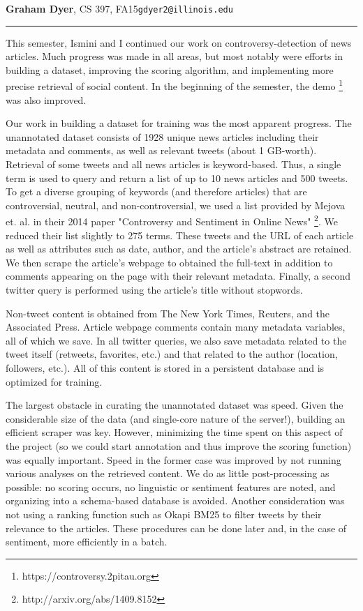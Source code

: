 \documentclass{article}[12pt]
\begin{document}
\noindent\textbf{Graham Dyer}, CS 397, FA15\hfill{\tt{gdyer2}\tt{@}\tt{illinois}\tt{.}\tt{edu}}
\hrule
\vspace{5mm}
This semester, Ismini and I continued our work on controversy-detection of news articles. Much progress was made in all areas, but most notably were efforts in building a dataset, improving the scoring algorithm, and implementing more precise retrieval of social content. In the beginning of the semester, the demo \footnote{https://controversy.2pitau.org} was also improved.

Our work in building a dataset for training was the most apparent progress. The unannotated dataset consists of 1928 unique news articles including their metadata and comments, as well as relevant tweets (about 1 GB-worth). Retrieval of some tweets and all news articles is keyword-based. Thus, a single term is used to query and return a list of up to 10 news articles and 500 tweets. To get a diverse grouping of keywords (and therefore articles) that are controversial, neutral, and non-controversial, we used a list provided by Mejova et. al. in their 2014 paper "Controversy and Sentiment in Online News" \footnote{http://arxiv.org/abs/1409.8152}. We reduced their list slightly to 275 terms. These tweets and the URL of each article as well as attributes such as date, author, and the article's abstract are retained. We then scrape the article's webpage to obtained the full-text in addition to comments appearing on the page with their relevant metadata. Finally, a second twitter query is performed using the article's title without stopwords.

Non-tweet content is obtained from The New York Times, Reuters, and the Associated Press. Article webpage comments contain many metadata variables, all of which we save. In all twitter queries, we also save metadata related to the tweet itself (retweets, favorites, etc.) and that related to the author (location, followers, etc.). All of this content is stored in a persistent database and is optimized for training.

The largest obstacle in curating the unannotated dataset was speed. Given the considerable size of the data (and single-core nature of the server!), building an efficient scraper was key. However, minimizing the time spent on this aspect of the project (so we could start annotation and thus improve the scoring function) was equally important. Speed in the former case was improved by not running various analyses on the retrieved content. We do as little post-processing as possible: no scoring occurs, no linguistic or sentiment features are noted, and organizing into a schema-based database is avoided. Another consideration was not using a ranking function such as Okapi BM25 to filter tweets by their relevance to the articles. These procedures can be done later and, in the case of sentiment, more efficiently in a batch.
\end{document}
